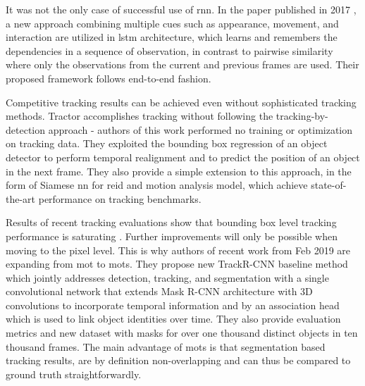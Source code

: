     It was not the only case of successful use of \gls{rnn}. In the paper published in 2017 \cite{sadeghian2017tracking}, a new approach combining multiple cues such as appearance, movement, and interaction are utilized in \gls{lstm} architecture, which learns and remembers the dependencies in a sequence of observation, in contrast to pairwise similarity where only the observations from the current and previous frames are used. Their proposed framework follows end-to-end fashion.
    
    Competitive tracking results can be achieved even without sophisticated tracking methods. Tractor \cite{DBLP:journals/corr/abs-1903-05625} accomplishes tracking without following the tracking-by-detection approach - authors of this work performed no training or optimization on tracking data. They exploited the bounding box regression of an object detector to perform temporal realignment and to predict the position of an object in the next frame. They also provide a simple extension to this approach, in the form of Siamese \gls{nn} for \gls{reid} and motion analysis model, which achieve state-of-the-art performance on tracking benchmarks. 
    
    Results of recent tracking evaluations show that bounding box level tracking performance is saturating \cite{mot16}. Further improvements will only be possible when moving to the pixel level. This is why authors of recent work from Feb 2019 are expanding from \gls{mot} to \gls{mots}. They propose new TrackR-CNN baseline method which jointly addresses detection, tracking, and segmentation with a single convolutional network that extends Mask R-CNN architecture with 3D convolutions to incorporate temporal information and by an association head which is used to link object identities over time. They also provide evaluation metrics and new dataset with masks for over one thousand distinct objects in ten thousand frames. The main advantage of \gls{mots} is that segmentation based tracking results, are by definition non-overlapping and can thus be compared to ground truth straightforwardly.
    